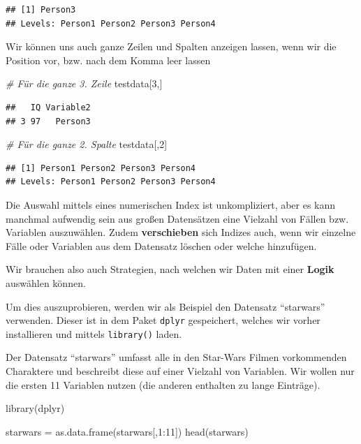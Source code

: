 \documentclass[
]{book}
\newenvironment{Shaded}{\begin{snugshade}}{\end{snugshade}}
\newcommand{\CommentTok}[1]{\textcolor[rgb]{0.56,0.35,0.01}{\textit{#1}}}
\newcommand{\DecValTok}[1]{\textcolor[rgb]{0.00,0.00,0.81}{#1}}
\newcommand{\FunctionTok}[1]{\textcolor[rgb]{0.00,0.00,0.00}{#1}}
\newcommand{\NormalTok}[1]{#1}
\newcommand{\OtherTok}[1]{\textcolor[rgb]{0.56,0.35,0.01}{#1}}
\newcommand{\SpecialCharTok}[1]{\textcolor[rgb]{0.00,0.00,0.00}{#1}}
\begin{document}
\begin{verbatim}
## [1] Person3
## Levels: Person1 Person2 Person3 Person4
\end{verbatim}

Wir können uns auch ganze Zeilen und Spalten anzeigen lassen, wenn wir die Position vor, bzw. nach dem Komma leer lassen

\begin{Shaded}
\begin{Highlighting}[]
\CommentTok{\# Für die ganze 3. Zeile}
\NormalTok{testdata[}\DecValTok{3}\NormalTok{,]}
\end{Highlighting}
\end{Shaded}

\begin{verbatim}
##   IQ Variable2
## 3 97   Person3
\end{verbatim}

\begin{Shaded}
\begin{Highlighting}[]
\CommentTok{\# Für die ganze 2. Spalte}
\NormalTok{testdata[,}\DecValTok{2}\NormalTok{]}
\end{Highlighting}
\end{Shaded}

\begin{verbatim}
## [1] Person1 Person2 Person3 Person4
## Levels: Person1 Person2 Person3 Person4
\end{verbatim}

Die Auswahl mittels eines numerischen Index ist unkompliziert, aber es kann manchmal aufwendig sein aus großen Datensätzen eine Vielzahl von Fällen bzw. Variablen auszuwählen.
Zudem \textbf{verschieben} sich Indizes auch, wenn wir einzelne Fälle oder Variablen aus dem Datensatz löschen oder welche hinzufügen.

Wir brauchen also auch Strategien, nach welchen wir Daten mit einer \textbf{Logik} auswählen können.

Um dies auszuprobieren, werden wir als Beispiel den Datensatz ``starwars'' verwenden. Dieser ist in dem Paket \texttt{dplyr} gespeichert, welches wir vorher installieren und mittels \texttt{library()} laden.

Der Datensatz ``starwars'' umfasst alle in den Star-Wars Filmen vorkommenden Charaktere und beschreibt diese auf einer Vielzahl von Variablen.
Wir wollen nur die ersten 11 Variablen nutzen (die anderen enthalten zu lange Einträge).

\begin{Shaded}
\begin{Highlighting}[]
\FunctionTok{library}\NormalTok{(dplyr)}

\NormalTok{starwars }\OtherTok{=} \FunctionTok{as.data.frame}\NormalTok{(starwars[,}\DecValTok{1}\SpecialCharTok{:}\DecValTok{11}\NormalTok{])}
\FunctionTok{head}\NormalTok{(starwars)}
\end{Highlighting}
\end{Shaded}
\end{document}
